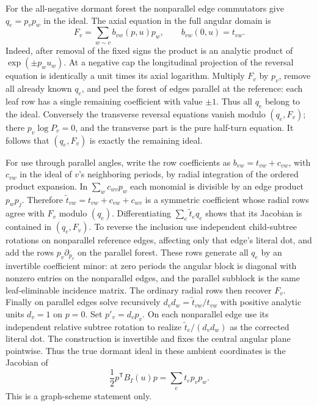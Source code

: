 For the all-negative dormant forest the nonparallel edge commutators
give \(q_e=p_vp_w\) in the ideal. The axial equation in the full
angular domain is
\[
 F_v=\sum_{w\sim v}b_{vw}(p,u)p_w,\qquad
 b_{vw}(0,u)=t_{vw}.
\]
Indeed, after removal of the fixed signs the product is an analytic
product of \(\exp(\pm p_wu_w)\). At a negative cap the longitudinal
projection of the reversal equation is identically a unit times its
axial logarithm. Multiply \(F_v\) by \(p_v\), remove all already known
\(q_e\), and peel the forest of edges parallel at the reference:
each leaf row has a single remaining coefficient with value \(\pm1\).
Thus all \(q_e\) belong to the ideal. Conversely the transverse
reversal equations vanish modulo \((q_e,F_v)\); there \(p_v\log P_v=0\),
and the transverse part is the pure half-turn equation. It follows
that \((q_e,F_v)\) is exactly the remaining ideal.

For use through parallel angles, write the row coefficients as
\(b_{vw}=t_{vw}+c_{vw}\), with \(c_{vw}\) in the ideal of \(v\)'s
neighboring periods, by radial integration of the ordered product
expansion. In \(\sum_w c_{wv}p_w\) each monomial is divisible by an
edge product \(p_wp_j\). Therefore
\(\widetilde t_{vw}=t_{vw}+c_{vw}+c_{wv}\) is a symmetric coefficient
whose radial rows agree with \(F_v\) modulo \((q_e)\). Differentiating
\(\sum_e\widetilde t_e q_e\) shows that its Jacobian is contained in
\((q_e,F_v)\). To reverse the inclusion use independent child-subtree
rotations on nonparallel reference edges, affecting only that edge's
literal dot, and add the rows \(p_v\partial_{p_v}\) on the parallel
forest. These rows generate all \(q_e\) by an invertible coefficient
minor: at zero periods the angular block is diagonal with nonzero
entries on the nonparallel edges, and the parallel subblock is the
same leaf-eliminable incidence matrix. The ordinary radial rows then
recover \(F_v\). Finally on parallel edges solve recursively
\(d_vd_w=\widetilde t_{vw}/t_{vw}\) with positive analytic units
\(d_v=1\) on \(p=0\). Set \(p'_v=d_vp_v\). On each nonparallel edge
use its independent relative subtree rotation to realize
\(\widetilde t_e/(d_vd_w)\) as the corrected literal dot. The
construction is invertible and fixes the central angular plane
pointwise. Thus the true dormant ideal in these ambient coordinates
is the Jacobian of
\[
 \frac12 p^{\mathsf T}B_I(u)p=\sum_e t_e p_vp_w .
\]
This is a graph-scheme statement only.

